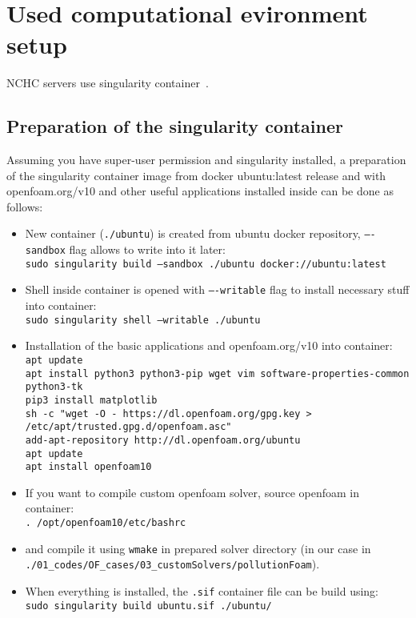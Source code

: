 \cleardoublepage

\section{Used computational evironment setup}
\label{sec:env}

NCHC servers use singularity container~\cite{singularity}.

\subsection{Preparation of the singularity container}
\label{subsec:prepCont}

Assuming you have super-user permission and singularity installed, a preparation of the singularity container image from docker ubuntu:latest release and with openfoam.org/v10 and other useful applications installed inside can be done as follows:
\begin{itemize}
    \item New container (\texttt{./ubuntu}) is created from ubuntu docker repository, \texttt{----sandbox} flag allows to write into it later:\\[0.2cm] 
    \texttt{sudo singularity build --sandbox ./ubuntu docker://ubuntu:latest}
    \item Shell inside container is opened with \texttt{----writable} flag to install necessary stuff into container:\\[0.2cm] 
    \texttt{sudo singularity shell --writable ./ubuntu}
    \item Installation of the basic applications and openfoam.org/v10 into container:\\[0.2cm] 
    \texttt{apt update}\\
    \texttt{apt install python3 python3-pip wget vim software-properties-common \\ \indent\quad\quad python3-tk}\\
    \texttt{pip3 install matplotlib}\\
    \texttt{sh -c "wget -O - https://dl.openfoam.org/gpg.key >} \\ \indent\quad\quad\texttt{/etc/apt/trusted.gpg.d/openfoam.asc"}\\
    \texttt{add-apt-repository http://dl.openfoam.org/ubuntu}\\
    \texttt{apt update}\\
    \texttt{apt install openfoam10}
    \item If you want to compile custom openfoam solver, source openfoam in container:\\[0.2cm] 
    \texttt{. /opt/openfoam10/etc/bashrc}
    \item and compile it using \texttt{wmake} in prepared solver directory (in our case in\\ \texttt{./01\_codes/OF\_cases/03\_customSolvers/pollutionFoam}).
    \item When everything is installed, the \texttt{.sif} container file can be build using:\\[0.2cm] 
    \texttt{sudo singularity build ubuntu.sif ./ubuntu/}
\end{itemize}

